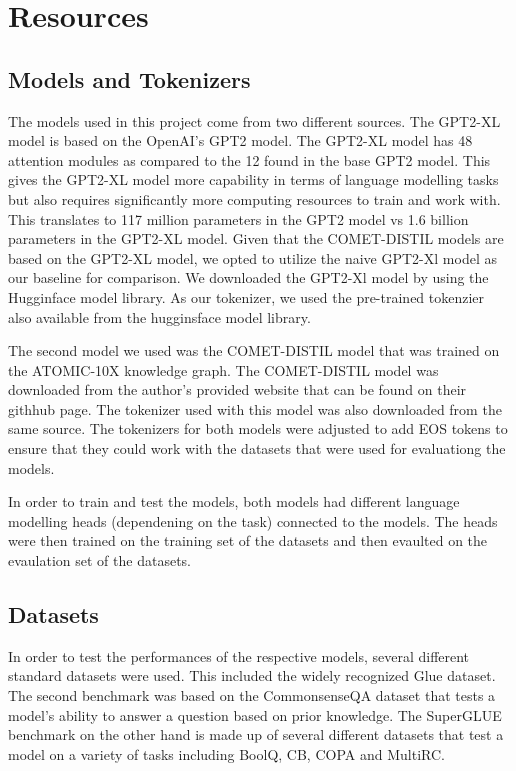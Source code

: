 \documentclass[\main/thesis.tex]{subfiles}
\begin{document}
\chapter{Resources}\label{sec:resources} 


\section{Models and Tokenizers}\label{sec:models}

The models used in this project come from two different sources. The GPT2-XL model is based on the OpenAI's GPT2 
model\cite{radford_language_nodate}. The GPT2-XL model has 48 attention modules as compared to the 12 found in the base 
GPT2 model. This gives the GPT2-XL model more capability in terms of language modelling tasks but also requires 
significantly more computing resources to train and work with\cite{noauthor_pretrained_nodate}. This translates to 117 
million parameters in the GPT2 model vs 1.6 billion parameters in the GPT2-XL model. Given that the COMET-DISTIL models
are based on the GPT2-XL model, we opted to utilize the naive GPT2-Xl model as our baseline for comparison. We 
downloaded the GPT2-Xl model by using the Hugginface model library\cite{noauthor_gpt2-xl_nodate}. As our tokenizer, we 
used the pre-trained tokenzier also available from the hugginsface model library\cite{noauthor_gpt2-xl_nodate}. 

The second model we used was the COMET-DISTIL model\cite{west_symbolic_2021} that was trained on the ATOMIC-10X 
knowledge graph. The COMET-DISTIL model was downloaded from the author's provided website that can be found on their 
githhub page\cite{peterwestai2_symbolic_2022}. The tokenizer used with this model was also downloaded from the same 
source. The tokenizers for both models were adjusted to add EOS tokens to ensure that they could work with the datasets 
that were used for evaluationg the models. 

In order to train and test the models, both models had different language modelling heads (dependening on the task) 
connected to the models. The heads were then trained on the training set of the datasets and then evaulted on 
the evaulation set of the datasets. 

\section{Datasets}\label{sec:datasets}
In order to test the performances of the respective models, several different standard datasets were used. This 
included the widely recognized Glue dataset\cite{wang_glue_2019}. The second benchmark was based on the 
CommonsenseQA dataset\cite{talmor_commonsenseqa_2018} that tests a model's ability to answer a question based on prior 
knowledge. The SuperGLUE benchmark on the other hand is made up of several different datasets that test a model on a 
variety of tasks including BoolQ, CB, COPA and MultiRC.\@
\end{document}
